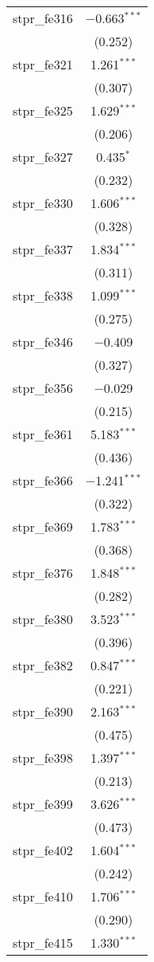 \begin{table}[!htbp]
\begin{tabular}{@{\extracolsep{5pt}}lc}
  stpr\_fe316 & $-$0.663$^{***}$ \\ 
  & (0.252) \\ 
  stpr\_fe321 & 1.261$^{***}$ \\ 
  & (0.307) \\ 
  stpr\_fe325 & 1.629$^{***}$ \\ 
  & (0.206) \\ 
  stpr\_fe327 & 0.435$^{*}$ \\ 
  & (0.232) \\ 
  stpr\_fe330 & 1.606$^{***}$ \\ 
  & (0.328) \\ 
  stpr\_fe337 & 1.834$^{***}$ \\ 
  & (0.311) \\ 
  stpr\_fe338 & 1.099$^{***}$ \\ 
  & (0.275) \\ 
  stpr\_fe346 & $-$0.409 \\ 
  & (0.327) \\ 
  stpr\_fe356 & $-$0.029 \\ 
  & (0.215) \\ 
  stpr\_fe361 & 5.183$^{***}$ \\ 
  & (0.436) \\ 
  stpr\_fe366 & $-$1.241$^{***}$ \\ 
  & (0.322) \\ 
  stpr\_fe369 & 1.783$^{***}$ \\ 
  & (0.368) \\ 
  stpr\_fe376 & 1.848$^{***}$ \\ 
  & (0.282) \\ 
  stpr\_fe380 & 3.523$^{***}$ \\ 
  & (0.396) \\ 
  stpr\_fe382 & 0.847$^{***}$ \\ 
  & (0.221) \\ 
  stpr\_fe390 & 2.163$^{***}$ \\ 
  & (0.475) \\ 
  stpr\_fe398 & 1.397$^{***}$ \\ 
  & (0.213) \\ 
  stpr\_fe399 & 3.626$^{***}$ \\ 
  & (0.473) \\ 
  stpr\_fe402 & 1.604$^{***}$ \\ 
  & (0.242) \\ 
  stpr\_fe410 & 1.706$^{***}$ \\ 
  & (0.290) \\ 
  stpr\_fe415 & 1.330$^{***}$ \\ 

\end{tabular}
\end{table}
